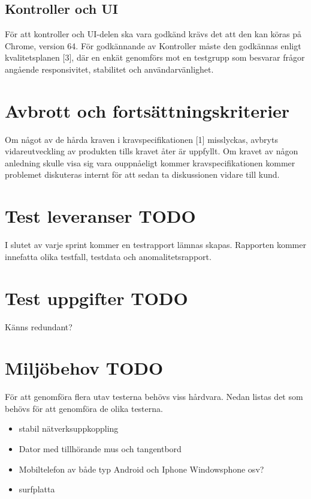 \documentclass[10pt]{article}
\begin{document}
	\subsection{Kontroller och UI}
		För att kontroller och UI-delen ska vara godkänd krävs det att den kan köras på Chrome, version 64. För godkännande av Kontroller måste den godkännas enligt kvalitetsplanen {\color{red}[3]}, där en enkät genomförs mot en testgrupp som besvarar frågor angående responsivitet, stabilitet och användarvänlighet.



\section{Avbrott och fortsättningskriterier}
	Om något av de hårda kraven i kravspecifikationen {\color{red}[1]} misslyckas, avbryts vidareutveckling av produkten tills kravet åter är uppfyllt. Om kravet av någon anledning skulle visa sig vara ouppnåeligt kommer kravspecifikationen kommer problemet diskuteras internt för att sedan ta diskussionen vidare till kund. 



\section{Test leveranser {\color{red}TODO}}
	I slutet av varje sprint kommer en testrapport lämnas skapas. Rapporten kommer innefatta olika testfall, testdata och anomalitetsrapport.


\section{Test uppgifter {\color{red}TODO}}
	Känns redundant?


\section{Miljöbehov {\color{red}TODO}}
	För att genomföra flera utav testerna behövs viss hårdvara. Nedan listas det som behövs för att genomföra de olika testerna. 

	\begin{itemize}
	\item stabil nätverksuppkoppling
	\item Dator med tillhörande mus och tangentbord
	\item Mobiltelefon av både typ Android och Iphone {\color{red}Windowsphone osv?}
	\item surfplatta
	\end{itemize}
\end{document}
